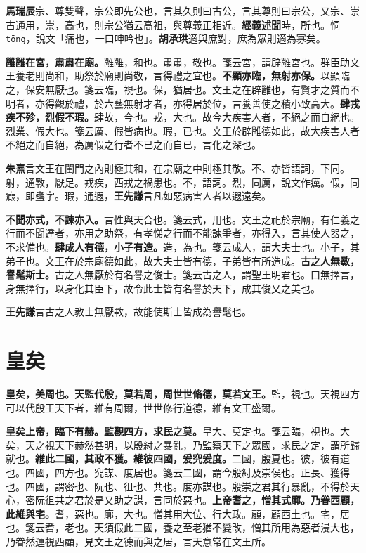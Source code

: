 \begin{quoting}\textbf{馬瑞辰}宗、尊雙聲，宗公即先公也，言其久則曰古公，言其尊則曰宗公，又宗、崇古通用，崇，高也，則宗公猶云高祖，與尊義正相近。\textbf{經義述聞}時，所也。恫 \texttt{tōng}，說文「痛也，一曰呻吟也」。\textbf{胡承珙}適與庶對，庶為眾則適為寡矣。\end{quoting}

\textbf{雝雝在宮，肅肅在廟。}{\footnotesize 雝雝，和也。肅肅，敬也。箋云宮，謂辟雝宮也。群臣助文王養老則尚和，助祭於廟則尚敬，言得禮之宜也。}\textbf{不顯亦臨，無射亦保。}{\footnotesize 以顯臨之，保安無厭也。箋云臨，視也。保，猶居也。文王之在辟雝也，有賢才之質而不明者，亦得觀於禮，於六藝無射才者，亦得居於位，言養善使之積小致高大。}\textbf{肆戎疾不殄，烈假不瑕。}{\footnotesize 肆故，今也。戎，大也。故今大疾害人者，不絕之而自絕也。烈業、假大也。箋云厲、假皆病也。瑕，已也。文王於辟雝德如此，故大疾害人者不絕之而自絕，為厲假之行者不已之而自已，言化之深也。}

\begin{quoting}\textbf{朱熹}言文王在閨門之內則極其和，在宗廟之中則極其敬。不、亦皆語詞，下同。射，通斁，厭足。戎疾，西戎之禍患也。不，語詞。烈，同厲，說文作癘。假，同瘕，即蠱字。瑕，通遐，\textbf{王先謙}言凡如惡病害人者以遐遠矣。\end{quoting}

\textbf{不聞亦式，不諫亦入。}{\footnotesize 言性與天合也。箋云式，用也。文王之祀於宗廟，有仁義之行而不聞達者，亦用之助祭，有孝悌之行而不能諫爭者，亦得入，言其使人器之，不求備也。}\textbf{肆成人有德，小子有造。}{\footnotesize 造，為也。箋云成人，謂大夫士也。小子，其弟子也。文王在於宗廟德如此，故大夫士皆有德，子弟皆有所造成。}\textbf{古之人無斁，譽髦斯士。}{\footnotesize 古之人無厭於有名譽之俊士。箋云古之人，謂聖王明君也。口無擇言，身無擇行，以身化其臣下，故令此士皆有名譽於天下，成其俊乂之美也。}

\begin{quoting}\textbf{王先謙}言古之人教士無厭斁，故能使斯士皆成為譽髦也。\end{quoting}

\section{皇矣}


\textbf{皇矣，美周也。天監代殷，莫若周，周世世脩德，莫若文王。}{\footnotesize 監，視也。天視四方可以代殷王天下者，維有周爾，世世修行道德，維有文王盛爾。}

\textbf{皇矣上帝，臨下有赫。監觀四方，求民之莫。}{\footnotesize 皇大、莫定也。箋云臨，視也。大矣，天之視天下赫然甚明，以殷紂之暴亂，乃監察天下之眾國，求民之定，謂所歸就也。}\textbf{維此二國，其政不獲。維彼四國，爰究爰度。}{\footnotesize 二國，殷夏也。彼，彼有道也。四國，四方也。究謀、度居也。箋云二國，謂今殷紂及崇侯也。正長、獲得也。四國，謂密也、阮也、徂也、共也。度亦謀也。殷崇之君其行暴亂，不得於天心，密阮徂共之君於是又助之謀，言同於惡也。}\textbf{上帝耆之，憎其式廓。乃眷西顧，此維與宅。}{\footnotesize 耆，惡也。廓，大也。憎其用大位、行大政。顧，顧西土也。宅，居也。箋云耆，老也。天須假此二國，養之至老猶不變改，憎其所用為惡者浸大也，乃眷然運視西顧，見文王之德而與之居，言天意常在文王所。}

